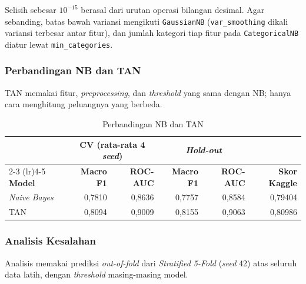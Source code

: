 Selisih sebesar $10^{-15}$ berasal dari urutan operasi bilangan desimal. Agar sebanding, batas bawah variansi mengikuti \texttt{GaussianNB} (\texttt{var\_smoothing} dikali variansi terbesar antar fitur), dan jumlah kategori tiap fitur pada \texttt{CategoricalNB} diatur lewat \texttt{min\_categories}.

\subsubsection{Perbandingan NB dan TAN}
TAN memakai fitur, \textit{preprocessing}, dan \textit{threshold} yang sama dengan NB; hanya cara menghitung peluangnya yang berbeda.

\begin{table}[H]
	\centering
	\caption{Perbandingan NB dan TAN}
	\label{tab:nb-tan}
	\setlength{\tabcolsep}{4pt}
	\begin{tabular}{l r r r r r}
		\toprule
		& \multicolumn{2}{c}{\textbf{CV (rata-rata 4 \textit{seed})}} & \multicolumn{2}{c}{\textbf{\textit{Hold-out}}} & \\
		\cmidrule(lr){2-3} \cmidrule(lr){4-5}
		\textbf{Model} & \textbf{Macro F1} & \textbf{ROC-AUC} & \textbf{Macro F1} & \textbf{ROC-AUC} & \textbf{Skor Kaggle} \\
		\midrule
		\textit{Naive Bayes} & 0,7810 & 0,8636 & 0,7757 & 0,8584 & 0,79404 \\
		TAN & 0,8094 & 0,9009 & 0,8155 & 0,9063 & 0,80986 \\
		\bottomrule
	\end{tabular}
\end{table}

{\small
{}\par}

\subsubsection{Analisis Kesalahan}
Analisis memakai prediksi \textit{out-of-fold} dari \textit{Stratified 5-Fold} (\textit{seed} 42) atas seluruh data latih, dengan \textit{threshold} masing-masing model.

